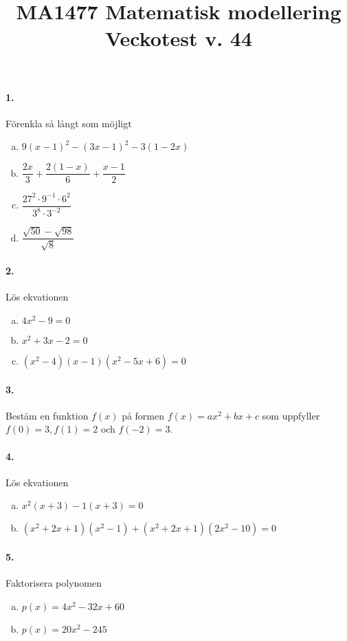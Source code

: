 \documentclass[a4paper]{article}
\title{\bf MA1477 Matematisk modellering \\[10pt]  Veckotest v.
  44}
\date{}
\begin{document}
\maketitle

\paragraph{1.} Förenkla så långt som möjligt
\begin{enumerate}[(a)]
\item $9(x-1)^2 - (3x-1)^2 - 3(1-2x)$
\item $\dfrac{2x}{3} + \dfrac{2(1-x)}{6} + \dfrac{x-1}{2}$
\item $\dfrac{27^2\cdot 9^{-1}\cdot 6^2}{3^8\cdot 3^{-2}}$
\item $\dfrac{\sqrt{50} - \sqrt{98}}{\sqrt{8}}$
\end{enumerate}
\paragraph{2.} Lös ekvationen
\begin{enumerate}[(a)]
\item $4x^2 - 9 = 0$
\item $x^2 + 3x -2 =0  $
\item $(x^2-4)(x-1)(x^2 - 5x + 6) = 0$
\end{enumerate}
\paragraph{3.} Bestäm en funktion $f(x)$ på formen $f(x) = ax^2 + bx +c$
som uppfyller $f(0) = 3, f(1) = 2$ och $f(-2) = 3$.
\paragraph{4.} Lös ekvationen
\begin{enumerate}[(a)]
\item $x^2(x+3) - 1(x+3) = 0$
\item $(x^2+2x+1)(x^2-1) + (x^2+2x +1)(2x^2 -10) = 0  $
\end{enumerate}
\paragraph{5.} Faktorisera polynomen
\begin{enumerate}[(a)] 
\item $p(x) = 4x^2 -32x +60$
\item $p(x) = 20x^2 -245$
\end{enumerate}
\end{document}
